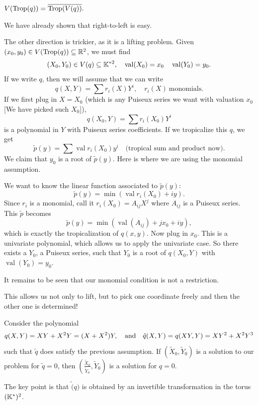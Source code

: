 \documentclass[12pt]{memoir}
\DeclareMathOperator{\val}{val}
\DeclareMathOperator{\Trop}{Trop}
\theoremstyle{definition}
\begin{document}
\begin{Th}
$V(\Trop(q))=\ov{\Trop(V(q))}.$
\end{Th}

\begin{ptcbp}
We have already shown that right-to-left is easy.\par 
The other direction is trickier, as it is a lifting problem. Given $(x_0,y_0)\in V(\Trop(q))\subseteq\bR^2$, we must find 
$$(X_0,Y_0)\in V(q)\subseteq \bK^{\ast2},\quad\val(X_0)=x_0\quad\val(Y_0)=y_0.$$
If we write $q$, then we will assume that we can write 
$$q(X,Y)=\sum r_i(X)Y^i,\quad r_i(X)\ \text{monomials}.$$
If we first plug in $X=X_0$ (which is any Puiseux series we want with valuation $x_0$ [We have picked such $X_0$]), 
$$q(X_0,Y)=\sum r_i(X_0)Y^i$$
is a polynomial in $Y$ with Puiseux series coefficients. If we tropicalize this $q$, we get 
$$\tilde{p}(y)=\sum\val r_i(X_0)y^i\quad\text{(tropical sum and product now)}.$$
We claim that $y_0$ is a root of $\tilde{p}(y)$. Here is where we are using the monomial assumption.\par 
We want to know the linear function associated to $\tilde{p}(y)$:
$$\tilde{p}(y)=\min(\val r_i(X_0)+iy).$$
Since $r_i$ is a monomial, call it $r_i(X_0)=A_{ij}X^j$ where $A_{ij}$ is a Puiseux series. This $\tilde{p}$ becomes
$$\tilde{p}(y)=\min(\val(A_{ij})+jx_0+iy),$$
which is exactly the tropicalization of $q(x,y)$. Now plug in $x_0$. This is a univariate polynomial, which allows us to apply the univariate case. So there exists a $Y_0$, a Puiseux series, such that $Y_0$ is a root of $q(X_0,Y)$ with $\val(Y_0)=y_0$.\par 
It remains to be seen that our monomial condition is not a restriction. 
\end{ptcbp}

This allows us not only to lift, but to pick one coordinate freely and then the other one is determined!

\begin{Ex}
    Consider the polynomial 
    $$q(X,Y)=XY+X^2Y=(X+X^2)Y,\quad\text{and}\quad\tilde{q}(X,Y)=q(XY,Y)=XY^2+X^2Y^3$$
    such that $\tilde{q}$ does satisfy the previous assumption. If $(\tilde{X}_0,\tilde Y_0)$ is a solution to our problem for $\tilde{q}=0$, then $\left(\frac{\tilde{X}_0}{\tilde Y_0},\tilde Y_0\right)$ is a solution for $q=0$.\par 
    The key point is that $\tilde(q)$ is obtained by an invertible transformation in the torus $(\mathbb{K}^\ast)^2$.
\end{Ex}
\end{document}
